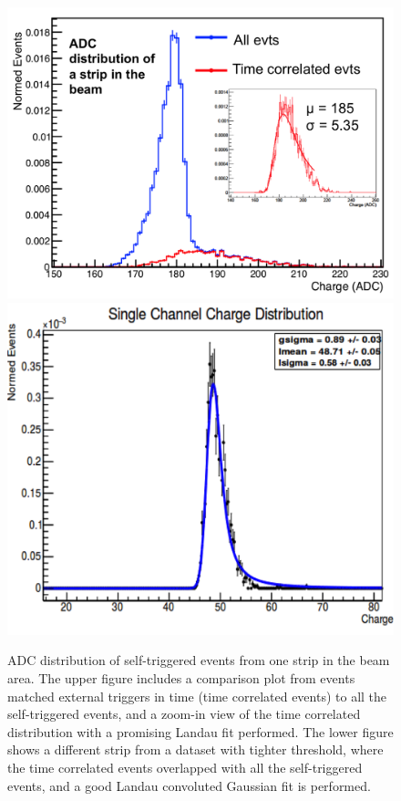 \documentclass[conference]{IEEEtran}
\begin{document}
\begin{figure}[!ht]%
  \centering
  \includegraphics[width=0.8\linewidth]{pics/Res_pic2.png}\\
  \includegraphics[width=0.8\linewidth]{pics/Res_pic3.png}
  \caption{
  ADC distribution of self-triggered events from one strip in the beam area.
  The upper figure includes a comparison plot from events matched external triggers in time (time correlated events) to all the self-triggered events,
  and a zoom-in view of the time correlated distribution with a promising Landau fit performed.
  The lower figure shows a different strip from a dataset with tighter threshold, where the time correlated events overlapped with all the self-triggered events,
  and a good Landau convoluted Gaussian fit is performed.
  }%
\label{fig:res2}%
\end{figure}

\end{document}
